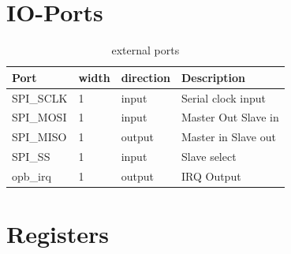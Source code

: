 \chapter{IO-Ports}
\begin{table} [h]
	\centering
		\begin{tabular}{|l|l|l|l|} \hline
		\textbf{Port}		& \textbf{width}	& \textbf{direction}	& \textbf{Description} \\ \hline
		SPI\_SCLK				& 1		& input			& Serial clock input	\\
		SPI\_MOSI				& 1		& input			& Master Out Slave in \\
		SPI\_MISO				& 1 	& output		& Master in Slave out	\\
		SPI\_SS					& 1		& input			& Slave select				\\ \hline
		opb\_irq				& 1		& output		& IRQ Output					\\ \hline
		\end{tabular}
	\caption{external ports}
	\label{tab:externalPorts}
\end{table}

\chapter{Registers}
